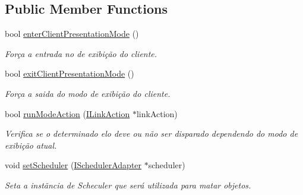 \subsection*{Public Member Functions}
\begin{DoxyCompactItemize}
\item 
bool \hyperlink{classbr_1_1ufscar_1_1lince_1_1ginga_1_1wac_1_1editing_1_1ModeManager_a5f62cca336317833ac6565a0acc779e6}{enterClientPresentationMode} ()
\begin{DoxyCompactList}\small\item\em Força a entrada no de exibição do cliente. \item\end{DoxyCompactList}\item 
bool \hyperlink{classbr_1_1ufscar_1_1lince_1_1ginga_1_1wac_1_1editing_1_1ModeManager_a7d095b1de1af73c3296f4b6a29c6f08f}{exitClientPresentationMode} ()
\begin{DoxyCompactList}\small\item\em Força a saida do modo de exibição do cliente. \item\end{DoxyCompactList}\item 
bool \hyperlink{classbr_1_1ufscar_1_1lince_1_1ginga_1_1wac_1_1editing_1_1ModeManager_a5456384c5ce5e3d7114429e5e28273b8}{runModeAction} (\hyperlink{classbr_1_1ufscar_1_1lince_1_1ginga_1_1wac_1_1editing_1_1ILinkAction}{ILinkAction} $\ast$linkAction)
\begin{DoxyCompactList}\small\item\em Verifica se o determinado elo deve ou não ser disparado dependendo do modo de exibição atual. \item\end{DoxyCompactList}\item 
void \hyperlink{classbr_1_1ufscar_1_1lince_1_1ginga_1_1wac_1_1editing_1_1ModeManager_ac73004e6c04b17ce1673e1fc2a179561}{setScheduler} (\hyperlink{classbr_1_1ufscar_1_1lince_1_1ginga_1_1wac_1_1editing_1_1ISchedulerAdapter}{ISchedulerAdapter} $\ast$scheduler)
\begin{DoxyCompactList}\small\item\em Seta a instãncia de Scheculer que será utilizada para matar objetos. \item\end{DoxyCompactList}\end{DoxyCompactItemize}
